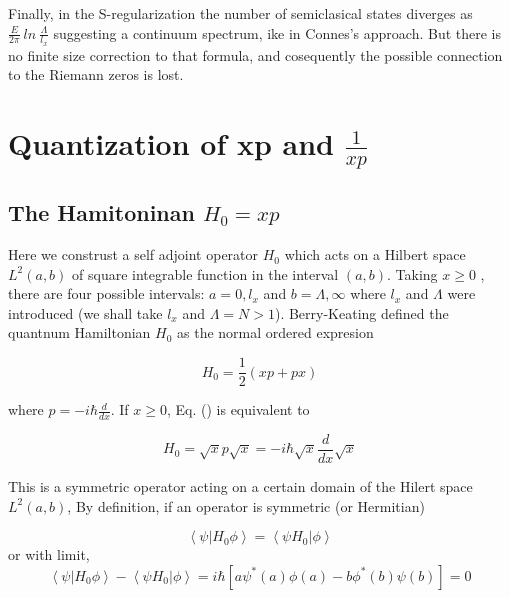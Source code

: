 \documentclass[12pt, letterpaper]{article}
\newcommand*{\1}{\hspace{1pt}}
\begin{document}
    Finally, in the S-regularization the number of semiclasical states diverges as $\frac{E}{2\pi} \ ln \ \frac{\Lambda}{l_{x}}$ suggesting a continuum spectrum, ike in 
    Connes's approach. But there is no finite size correction to that formula, and cosequently the possible connection to the Riemann zeros is lost.

    
    \section{Quantization of xp and $\frac{1}{xp}$}
    
    
    \subsection{The Hamitoninan $H_{0} = xp$}

        Here we construst a self adjoint operator $H_{0}$ which acts on a Hilbert space $L^{2}(a,b)$ of square integrable function in the interval $(a,b)$. Taking $x\geqslant 0$
        , there are four possible intervals: $a=0,l_{x}$ and $b=\Lambda, \infty $ where $l_{x}$ and $\Lambda$ were introduced (we shall take $l_{x}$ and $\Lambda = N > 1$).
        Berry-Keating defined the quantnum Hamiltonian $H_{0}$ as the normal ordered expresion 

        \begin{equation}
            H_{0} = \frac{1}{2}(xp + px)
        \end{equation}

        where $p = -i\hbar \frac{d}{dx}$. If $x\geqslant 0$, Eq. () is equivalent to

        \begin{equation}
            H_{0} = \sqrt{x} p \sqrt{x} = -i\hbar \sqrt{x} \frac{d}{dx} \sqrt{x}
        \end{equation}

        This is a symmetric operator acting on a certain domain of the Hilert space $L^{2}(a,b)$, By definition, if an operator is symmetric (or Hermitian)\cite{s5}

        \begin{equation}
            \left\langle\psi | H_{0}\phi \right\rangle = \left\langle\psi H_{0} |\phi \right\rangle
        \end{equation}
         or with limit,
        \begin{equation}
            \left\langle\psi | H_{0}\phi \right\rangle - \left\langle\psi H_{0} |\phi \right\rangle = i \hbar \left[a\psi ^{*}(a)\phi(a) - b\phi ^{*}(b)\psi(b)\right] = 0
        \end{equation}
        
\end{document}
